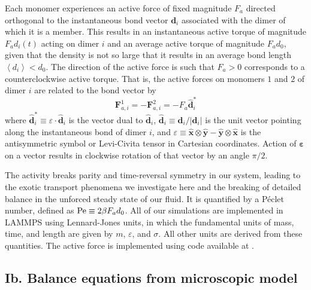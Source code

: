 \documentclass[%
 reprint,
superscriptaddress,
longbibliography,
 amsmath,amssymb,
 prl,
 citeautoscript,
]{revtex4-1}
\begin{document}
Each monomer experiences an active force of fixed magnitude $F_a$ directed orthogonal to the instantaneous bond vector ${\boldsymbol d}_i$ associated with the dimer of which it is a member. This results in an instantaneous active torque of magnitude $F_a d_i(t)$ acting on dimer $i$ and an average active torque of magnitude $F_a d_0$, given that the density is not so large that it results in an average bond length $\left\langle d_i \right\rangle < d_0$. The direction of the active force is such that $F_a > 0$ corresponds to a counterclockwise active torque. That is, the active forces on monomers $1$ and $2$ of dimer $i$ are related to the bond vector by
\begin{equation}
{\boldsymbol F}_{a,i}^1 = - {\boldsymbol F}_{a,i}^2 = - F_a \hat{\boldsymbol d}_i^*
\label{eqn:Fai12}
\end{equation}
where $\hat{\boldsymbol d}_i^* \equiv \varepsilon \cdot \hat{\boldsymbol d}_i$ is the vector dual to $\hat{\boldsymbol d}_i$, $\hat{\boldsymbol d}_i \equiv {\boldsymbol d}_i / \left| {\boldsymbol d}_i \right|$ is the unit vector pointing along the instantaneous bond of dimer $i$, and $\varepsilon \equiv \hat{\boldsymbol x} \otimes \hat{\boldsymbol y} - \hat{\boldsymbol y} \otimes \hat{\boldsymbol x}$ is the antisymmetric symbol or Levi-Civita tensor in Cartesian coordinates. Action of $\boldsymbol \varepsilon$ on a vector results in clockwise rotation of that vector by an angle $\pi/2$.

The activity breaks parity and time-reversal symmetry in our system, leading to the exotic transport phenomena we investigate here and the breaking of detailed balance in the unforced steady state of our fluid. It is quantified by a P\'{e}clet number, defined as ${\rm Pe} \equiv 2 \beta F_a d_0$. All of our simulations are implemented in LAMMPS using Lennard-Jones units, in which the fundamental units of mass, time, and length are given by $m$, $\varepsilon$, and $\sigma$. All other units are derived from these quantities. The active force is implemented using code available at 
\cite{Cory_github}.

\subsection{Ib. Balance equations from microscopic model}
\end{document}
